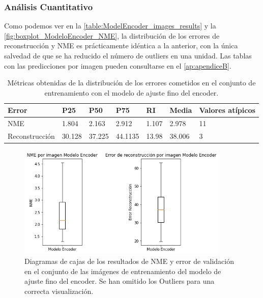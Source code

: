         \subsubsection*{Análisis Cuantitativo}

        \noindent Como podemos ver en la \autoref{table:ModelEncoder_images_results} y la \autoref{fig:boxplot_ModeloEncoder_NME}, la distribución de los errores de reconstrucción y NME es prácticamente idéntica a la anterior, con la única salvedad de que se ha reducido el número de outliers en una unidad. Las tablas con las predicciones por imagen pueden consultarse en el \autoref{ap:apendiceB}.

        \begin{table}[!ht]
            \centering
            \caption{Métricas obtenidas de la distribución de los errores cometidos en el conjunto de entrenamiento con el modelo de ajuste fino del encoder.}
            \begin{tabular}{|l|l|l|l|l|l|l|}
            \hline
            \cellcolor{gray!25}\textbf{Error} & \cellcolor{gray!25}\textbf{P25} & \cellcolor{gray!25}\textbf{P50} & \cellcolor{gray!25}\textbf{P75} & \cellcolor{gray!25}\textbf{RI} & \cellcolor{gray!25}\textbf{Media} & \cellcolor{gray!25}\textbf{Valores atípicos}\\ \hline
                NME & 1.804 & 2.163 & 2.912 & 1.107 & 2.978 & 11 \\ \hline
                Reconstrucción & 30.128 & 37.225 & 44.1135 & 13.98 & 38.006 & 3 \\ \hline
            \end{tabular}
            \label{table:ModelEncoder_images_results}
        \end{table}

        \begin{figure}[H]
            \centering
            \includegraphics[width=0.9\textwidth]{img/boxplot_encoder.png}
            \caption{Diagramas de cajas de los resultados de NME y error de validación en el conjunto de las imágenes de entrenamiento del modelo de ajuste fino del encoder. Se han omitido los Outliers para una correcta visualización.}
            \label{fig:boxplot_ModeloEncoder_NME}
        \end{figure}

